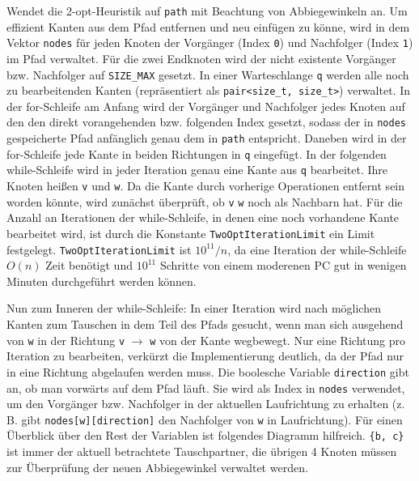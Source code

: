 \documentclass[a4paper, 10pt, ngerman]{article}
\begin{document}
\noindent Wendet die 2-opt-Heuristik auf \verb|path| mit Beachtung von Abbiegewinkeln an. Um effizient Kanten aus dem Pfad entfernen und neu einfügen zu könne, wird in dem Vektor \verb|nodes| für jeden Knoten der Vorgänger (Index \verb|0|) und Nachfolger (Index \verb|1|) im Pfad verwaltet. Für die zwei Endknoten wird der nicht existente Vorgänger bzw. Nachfolger auf \verb|SIZE_MAX| gesetzt. In einer Warteschlange \verb|q| werden alle noch zu bearbeitenden Kanten (repräsentiert als \verb|pair<size_t, size_t>|) verwaltet. In der for-Schleife am Anfang wird der Vorgänger und Nachfolger jedes Knoten auf den den direkt vorangehenden bzw. folgenden Index gesetzt, sodass der in \verb|nodes| gespeicherte Pfad anfänglich genau dem in \verb|path| entspricht. Daneben wird in der for-Schleife jede Kante in beiden Richtungen in \verb|q| eingefügt. In der folgenden while-Schleife wird in jeder Iteration genau eine Kante aus \verb|q| bearbeitet. Ihre Knoten heißen \verb|v| und \verb|w|. Da die Kante durch vorherige Operationen entfernt sein worden könnte, wird zunächst überprüft, ob \verb|v| \verb|w| noch als Nachbarn hat. Für die Anzahl an Iterationen der while-Schleife, in denen eine noch vorhandene Kante bearbeitet wird, ist durch die Konstante \verb|TwoOptIterationLimit| ein Limit festgelegt. \verb|TwoOptIterationLimit| ist $10^{11} / n$, da eine Iteration der while-Schleife $O(n)$ Zeit benötigt und $10^{11}$ Schritte von einem moderenen PC gut in wenigen Minuten durchgeführt werden können.

Nun zum Inneren der while-Schleife:  In einer Iteration wird nach möglichen Kanten zum Tauschen in dem Teil des Pfads gesucht, wenn man sich ausgehend von \verb|w| in der Richtung \verb|v| $\rightarrow$ \verb|w| von der Kante wegbewegt. Nur eine Richtung pro Iteration zu bearbeiten, verkürzt die Implementierung deutlich, da der Pfad nur in eine Richtung abgelaufen werden muss. Die boolesche Variable \verb|direction| gibt an, ob man vorwärts auf dem Pfad läuft. Sie wird als Index in \verb|nodes| verwendet, um den Vorgänger bzw. Nachfolger in der aktuellen Laufrichtung zu erhalten (z. B. gibt \verb|nodes[w][direction]| den Nachfolger von \verb|w| in Laufrichtung). Für einen Überblick über den Rest der Variablen ist folgendes Diagramm hilfreich. \verb|{b, c}| ist immer der aktuell betrachtete Tauschpartner, die übrigen 4 Knoten müssen zur Überprüfung der neuen Abbiegewinkel verwaltet werden.
\bigskip
\end{document}
